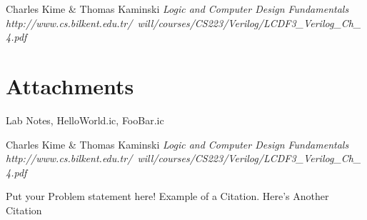 \documentclass[a4paper,12pt]{article}
\begin{document}
\begin{thebibliography}{1}
 Charles Kime \& Thomas Kaminski  \emph{Logic and Computer Design Fundamentals} \\ \hspace{15pt}\textit{http://www.cs.bilkent.edu.tr/~will/courses/CS223/Verilog/LCDF3_Verilog_Ch_4.pdf}
\end{thebibliography}
\ifx
\section*{Attachments}
Lab Notes, HelloWorld.ic, FooBar.ic

\begin{thebibliography}{9}
 Charles Kime & Thomas Kaminski  \emph{Logic and Computer Design Fundamentals} \textit{http://www.cs.bilkent.edu.tr/~will/courses/CS223/Verilog/LCDF3_Verilog_Ch_4.pdf}
\end{thebibliography}

Put your Problem statement here! Example of a Citation\cite[p.219]{Robotics}. Here's Another Citation\cite{Flueck}
\fi
\end{document}
